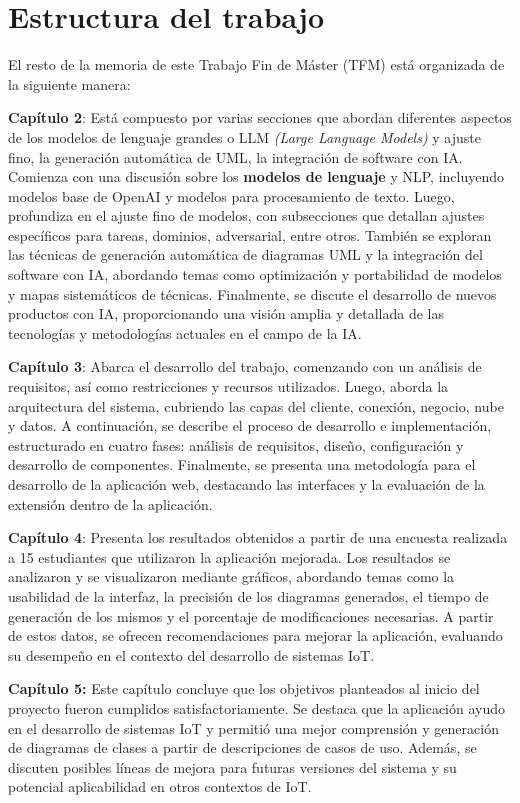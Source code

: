 \section{Estructura del trabajo}\label{section:estructura}

El resto de la memoria de este Trabajo Fin de Máster (TFM) está organizada de la siguiente manera:

\textbf{Capítulo 2}: Está compuesto por varias secciones que abordan diferentes aspectos de los modelos de lenguaje grandes o LLM \textit{(Large Language Models)} y ajuste fino, la generación automática de UML, la integración de software con IA. Comienza con una discusión sobre los \textbf{modelos de lenguaje} y NLP, incluyendo modelos base de OpenAI y modelos para procesamiento de texto. Luego, profundiza en el ajuste fino de modelos, con subsecciones que detallan ajustes específicos para tareas, dominios, adversarial, entre otros. También se exploran las técnicas de generación automática de diagramas UML y la integración del software con IA, abordando temas como optimización y portabilidad de modelos y mapas sistemáticos de técnicas. Finalmente, se discute el desarrollo de nuevos productos con IA, proporcionando una visión amplia y detallada de las tecnologías y metodologías actuales en el campo de la IA.

\textbf{Capítulo 3}:  Abarca el desarrollo del trabajo, comenzando con un análisis de requisitos, así como restricciones y recursos utilizados. Luego, aborda la arquitectura del sistema, cubriendo las capas del cliente, conexión, negocio, nube y datos. A continuación, se describe el proceso de desarrollo e implementación, estructurado en cuatro fases: análisis de requisitos, diseño, configuración y desarrollo de componentes. Finalmente, se presenta una metodología para el desarrollo de la aplicación web, destacando las interfaces y la evaluación de la extensión dentro de la aplicación.

\textbf{Capítulo 4}: Presenta los resultados obtenidos a partir de una encuesta realizada a 15 estudiantes que utilizaron la aplicación mejorada. Los resultados se analizaron y se visualizaron mediante gráficos, abordando temas como la usabilidad de la interfaz, la precisión de los diagramas generados, el tiempo de generación de los mismos y el porcentaje de modificaciones necesarias. A partir de estos datos, se ofrecen recomendaciones para mejorar la aplicación, evaluando su desempeño en el contexto del desarrollo de sistemas IoT.

\textbf{Capítulo 5:} Este capítulo concluye que los objetivos planteados al inicio del proyecto fueron cumplidos satisfactoriamente. Se destaca que la aplicación ayudo en el desarrollo de sistemas IoT y permitió una mejor comprensión y generación de diagramas de clases a partir de descripciones de casos de uso. Además, se discuten posibles líneas de mejora para futuras versiones del sistema y su potencial aplicabilidad en otros contextos de IoT.